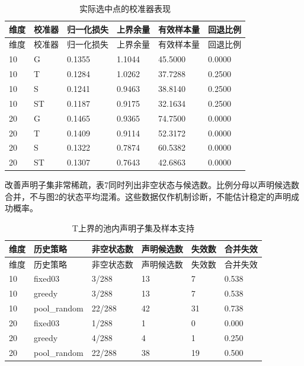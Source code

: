 \documentclass[11pt,a4paper]{article}
\begin{document}
\par\noindent\begin{minipage}{\linewidth}

\begin{longtable}[]{@{}llllll@{}}
\caption{实际选中点的校准器表现}\tabularnewline
\toprule
维度 & 校准器 & 归一化损失 & 上界余量 & 有效样本量 & 回退比例 \\
\midrule
\endfirsthead
\toprule
维度 & 校准器 & 归一化损失 & 上界余量 & 有效样本量 & 回退比例 \\
\midrule
\endhead
10 & G & 0.1355 & 1.1044 & 45.5000 & 0.0000 \\
10 & T & 0.1284 & 1.0262 & 37.7288 & 0.2500 \\
10 & S & 0.1241 & 0.9463 & 38.8140 & 0.2500 \\
10 & ST & 0.1187 & 0.9175 & 32.1634 & 0.2500 \\
20 & G & 0.1465 & 0.9365 & 74.7500 & 0.0000 \\
20 & T & 0.1409 & 0.9114 & 52.3172 & 0.0000 \\
20 & S & 0.1322 & 0.7874 & 60.5382 & 0.0000 \\
20 & ST & 0.1307 & 0.7643 & 42.6863 & 0.0000 \\
\bottomrule
\end{longtable}

\end{minipage}\par

改善声明子集非常稀疏，表7同时列出非空状态与候选数。比例分母以声明候选数合并，不与图2的状态平均混淆。这些数据仅作机制诊断，不能估计稳定的声明成功概率。

\par\noindent\begin{minipage}{\linewidth}

\begin{longtable}[]{@{}llllll@{}}
\caption{T上界的池内声明子集及样本支持}\tabularnewline
\toprule
维度 & 历史策略 & 非空状态数 & 声明候选数 & 失效数 & 合并失效 \\
\midrule
\endfirsthead
\toprule
维度 & 历史策略 & 非空状态数 & 声明候选数 & 失效数 & 合并失效 \\
\midrule
\endhead
10 & fixed03 & 3/288 & 13 & 7 & 0.538 \\
10 & greedy & 3/288 & 13 & 7 & 0.538 \\
10 & pool\_random & 22/288 & 42 & 31 & 0.738 \\
20 & fixed03 & 1/288 & 1 & 0 & 0.000 \\
20 & greedy & 4/288 & 4 & 1 & 0.250 \\
20 & pool\_random & 22/288 & 38 & 19 & 0.500 \\
\bottomrule
\end{longtable}

\end{minipage}\par
\end{document}
